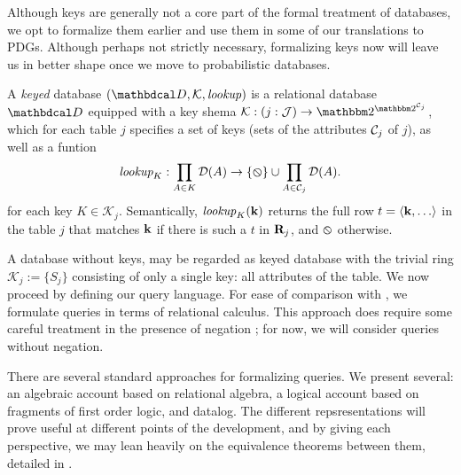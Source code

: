 \documentclass[the-pdg-manual.tex]{subfiles}
\begin{document}
Although keys are generally not a core part of the formal treatment of databases, we opt to formalize them earlier and use them in some of our translations to PDGs. Although perhaps not strictly necessary, formalizing keys now will leave us in better shape once we move to probabilistic databases.

\begin{defn}
	A \emph{keyed} database $(\D, \mathcal K, \mathit{lookup})$ is a relational database $\D$ %
	equipped with a key shema $\mathcal K : (j:\Idx) \to \two^{\two^{\Cols_j}}$, which for each table $j$ specifies a set of keys (sets of the attributes $\mathcal C_j$ of $j$), as well as a funtion
	$$\textit{lookup}_K : \prod_{A \in K}{\mathcal D}(A) \to \{\varobslash\} \cup \prod_{A \in \mathcal C_j}{\mathcal D}(A).$$
	for each key $K \in \mathcal K_j$. Semantically, $\mathit{lookup}_K(\mathbf k)$ returns the full row $t = \langle \mathbf k, \ldots \rangle$ in the table $j$ that matches $\mathbf k$ if there is such a $t$ in ${\mathbf R}_j$, and $\varobslash$ otherwise.
\end{defn}

A database without keys, may be regarded as keyed database with the trivial ring $\mathcal K_j := \{ S_j \}$ consisting of only a single key: all attributes of the table.
We now proceed by defining our query language. For ease of comparison with \cite{suciu2011probabilistic}, we formulate queries in terms of relational calculus. This approach does require some careful treatment in the presence of negation \cite[Chapter 5]{abiteboul1995foundations}; for now, we will consider queries without negation.

There are several standard approaches for formalizing queries. We present several: an algebraic account based on relational algebra, a logical account based on fragments of first order logic, and datalog. The different repsresentations will prove useful at different points of the development, and by giving each perspective, we may lean heavily on the equivalence theorems between them, detailed  in \cite{abiteboul1995foundations}.
\end{document}
